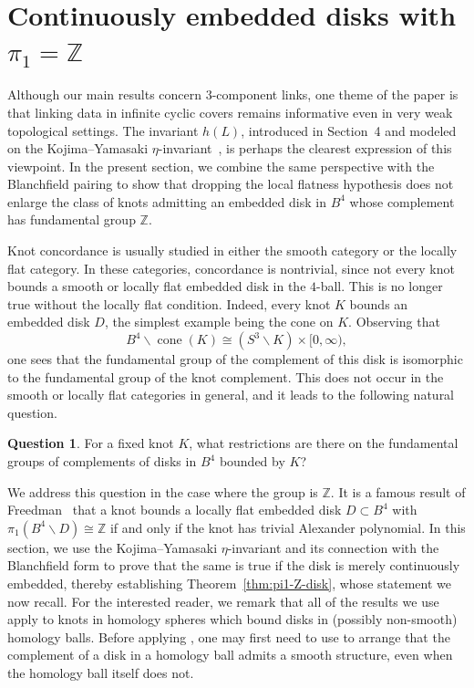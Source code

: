 \documentclass[a4paper, 11pt]{amsart}
\theoremstyle{definition}
\newtheorem{question}[theorem]{Question}
\newcommand{\Z}{\mathbb{Z}}
\begin{document}


\section{Continuously embedded disks with $\pi_1=\Z$}

\newcommand{\cone}{\operatorname{cone}}%


Although our main results concern \(3\)-component links, one theme of the paper is that linking data in infinite cyclic covers remains informative even in very weak topological settings. The invariant \(h(L)\), introduced in Section~4 and modeled on the Kojima--Yamasaki \(\eta\)-invariant~\cite{KojYam79}, is perhaps the clearest expression of this viewpoint. In the present section, we combine the same perspective with the Blanchfield pairing to show that dropping the local flatness hypothesis does not enlarge the class of knots admitting an embedded disk in \(B^4\) whose complement has fundamental group \(\mathbb Z\).

Knot concordance is usually studied in either the smooth category or the locally flat category. In these categories, concordance is nontrivial, since not every knot bounds a smooth or locally flat embedded disk in the $4$-ball. This is no longer true without the locally flat condition. Indeed, every knot $K$ bounds an embedded disk $D$, the simplest example being the cone on $K$. Observing that
\[
B^4\smallsetminus \cone(K) \cong (S^3\smallsetminus K)\times [0,\infty),
\]
one sees that the fundamental group of the complement of this disk is isomorphic to the fundamental group of the knot complement. This does not occur in the smooth or locally flat categories in general, and it leads to the following natural question.

\begin{question}
For a fixed knot $K$, what restrictions are there on the fundamental groups of complements of disks in $B^4$ bounded by $K$?
\end{question}

We address this question in the case where the group is $\Z$. It is a famous result of Freedman~\cite{Freedman1, Freedman-Quinn:1990-1, Garoufalidis-Teichner:2004-1} that a knot bounds a locally flat embedded disk $D\subset B^4$ with
$\pi_1(B^4\smallsetminus D)\cong \Z$
if and only if the knot has trivial Alexander polynomial. In this section, we use the Kojima--Yamasaki $\eta$-invariant and its connection with the Blanchfield form to prove that the same is true if the disk is merely continuously embedded,
thereby establishing Theorem~\ref{thm:pi1-Z-disk}, whose statement we now recall.  For the interested reader, we remark that all of the results we use apply to knots in homology spheres which bound disks in (possibly non-smooth) homology balls.  Before applying \cite[Lemma~5]{KojYam79}, one may first need to use \cite[Theorem~8.2]{Freedman-Quinn:1990-1} to arrange that the complement of a disk in a homology ball admits a smooth structure, even when the homology ball itself does not.
\end{document}
